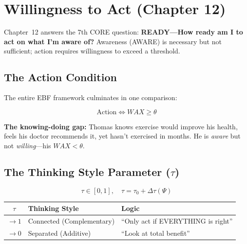 \section{Willingness to Act (Chapter 12)}
\label{sec:mp-willingness}

Chapter~12 answers the 7th CORE question: \textbf{READY---How ready am I to act on what I'm aware of?} Awareness (AWARE) is necessary but not sufficient; action requires willingness to exceed a threshold.

\subsection{The Action Condition}

The entire EBF framework culminates in one comparison:

\begin{equation}
\boxed{
\text{Action} \Leftrightarrow WAX \geq \theta
}
\label{eq:mp-action-condition}
\end{equation}

\textbf{The knowing-doing gap:} Thomas knows exercise would improve his health, feels his doctor recommends it, yet hasn't exercised in months. He is \emph{aware} but not \emph{willing}---his $WAX < \theta$.

\subsection{The Thinking Style Parameter ($\tau$)}

\begin{equation}
\boxed{
\tau \in [0, 1], \quad \tau = \tau_0 + \Delta\tau(\Psi)
}
\label{eq:mp-tau}
\end{equation}

\begin{center}
\renewcommand{\arraystretch}{1.2}
\begin{tabular}{@{}clp{6cm}@{}}
\toprule
$\tau$ & \textbf{Thinking Style} & \textbf{Logic} \\
\midrule
$\to 1$ & Connected (Complementary) & ``Only act if EVERYTHING is right'' \\
$\to 0$ & Separated (Additive) & ``Look at total benefit'' \\
\bottomrule
\end{tabular}
\end{center}

